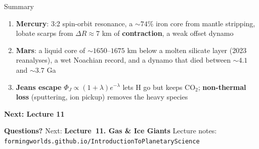 \documentclass[aspectratio=169, 11pt]{beamer}
\begin{document}
\begin{frame}
\end{frame}

\begin{frame}{Summary}
  \begin{enumerate}\setlength\itemsep{6pt}
    \item \textbf{Mercury}: 3:2 spin-orbit resonance, a $\sim 74\%$ iron core from mantle stripping, lobate scarps from $\Delta R \approx 7$ km of \textbf{contraction}, a weak offset dynamo
    \item \textbf{Mars}: a liquid core of $\sim 1650$--$1675$ km below a molten silicate layer (2023 reanalyses), a wet Noachian record, and a dynamo that died between $\sim 4.1$ and $\sim 3.7$ Ga
    \item \textbf{Jeans escape} $\Phi_J \propto (1+\lambda)e^{-\lambda}$ lets H go but keeps $\mathrm{CO_2}$; \textbf{non-thermal loss} (sputtering, ion pickup) removes the heavy species
  \end{enumerate}
  \vskip6pt
  \textbf{Next: Lecture 11}
\end{frame}

\begin{frame}
  \vfill
  \begin{center}
    {\color{white}\Large\bfseries Questions?}
    \vskip20pt
    {\color{ipsLightFill}\normalsize Next: \textbf{Lecture~11. Gas \& Ice Giants}}
    \vskip16pt
    {\color{ipsLightFill!70}\small Lecture notes: \texttt{formingworlds.github.io/IntroductionToPlanetaryScience}}
  \end{center}
  \vfill
\end{frame}
\end{document}
